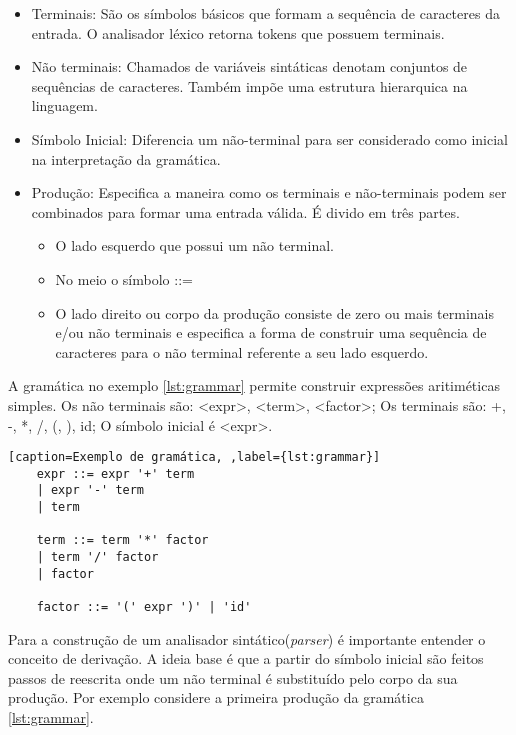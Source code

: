 \begin{itemize}
    \item Terminais: São os símbolos básicos que formam a sequência de caracteres da entrada. O analisador léxico retorna tokens que possuem
    terminais. 
    \item Não terminais: Chamados de variáveis sintáticas denotam conjuntos de sequências de caracteres. Também impõe 
    uma estrutura hierarquica na linguagem.
    \item Símbolo Inicial: Diferencia um não-terminal para ser considerado como inicial na interpretação da gramática.
    \item Produção: Especifica a maneira como os terminais e não-terminais podem ser combinados para formar uma entrada válida. É divido
    em três partes.
    \begin{itemize}
        \item O lado esquerdo que possui um não terminal.
        \item No meio o símbolo ::=
        \item O lado direito ou corpo da produção consiste de zero ou mais terminais e/ou não terminais e especifica
        a forma de construir uma sequência de caracteres para o não terminal referente a seu lado esquerdo.
    \end{itemize}
\end{itemize}

A gramática no exemplo \ref{lst:grammar} permite construir expressões aritiméticas simples. 
Os não terminais são: <expr>, <term>, <factor>; Os terminais são: +, -, *, /, (, ), id; O símbolo inicial é <expr>.

\begin{center}
    \begin{lstlisting}[caption=Exemplo de gramática, ,label={lst:grammar}]
    expr ::= expr '+' term 
    | expr '-' term
    | term

    term ::= term '*' factor 
    | term '/' factor
    | factor

    factor ::= '(' expr ')' | 'id'
    \end{lstlisting}
\end{center}


Para a construção de um analisador sintático(\textit{parser}) é importante entender o conceito de derivação. A ideia base
é que a partir do símbolo inicial são feitos passos de reescrita onde um não terminal é substituído pelo
corpo da sua produção. Por exemplo considere a primeira produção da gramática \ref{lst:grammar}. 


